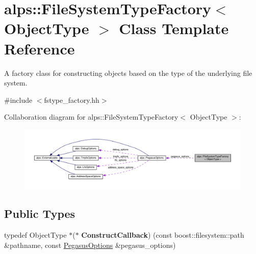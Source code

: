 \hypertarget{classalps_1_1FileSystemTypeFactory}{}\section{alps\+:\+:File\+System\+Type\+Factory$<$ Object\+Type $>$ Class Template Reference}
\label{classalps_1_1FileSystemTypeFactory}


A factory class for constructing objects based on the type of the underlying file system.  




{\ttfamily \#include $<$fstype\+\_\+factory.\+hh$>$}



Collaboration diagram for alps\+:\+:File\+System\+Type\+Factory$<$ Object\+Type $>$\+:
\nopagebreak
\begin{figure}[H]
\begin{center}
\leavevmode
\includegraphics[width=350pt]{classalps_1_1FileSystemTypeFactory__coll__graph}
\end{center}
\end{figure}
\subsection*{Public Types}
\begin{DoxyCompactItemize}
\item 
typedef Object\+Type $\ast$($\ast$ {\bfseries Construct\+Callback}) (const boost\+::filesystem\+::path \&pathname, const \hyperlink{structalps_1_1PegasusOptions}{Pegasus\+Options} \&pegasus\+\_\+options)\hypertarget{classalps_1_1FileSystemTypeFactory_ac969de7bdc5ea5846adb111c9b00154c}{}\label{classalps_1_1FileSystemTypeFactory_ac969de7bdc5ea5846adb111c9b00154c}

\end{DoxyCompactItemize}
